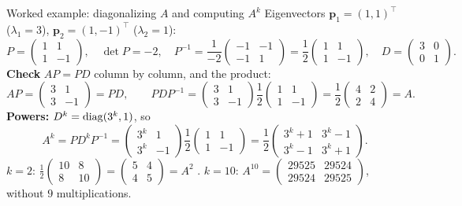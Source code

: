 \documentclass[aspectratio=1610,11pt]{beamer}
\begin{document}
\begin{frame}{Worked example: diagonalizing $A$ and computing $A^k$}
    \small
    Eigenvectors $\mathbf{p}_1 = (1, 1)^\top$ ($\lambda_1 = 3$), $\mathbf{p}_2 = (1, -1)^\top$ ($\lambda_2 = 1$):
    \[P = \begin{pmatrix} 1 & 1 \\ 1 & -1 \end{pmatrix}, \quad \det P = -2, \quad P^{-1} = \frac{1}{-2}\begin{pmatrix} -1 & -1 \\ -1 & 1 \end{pmatrix} = \frac{1}{2}\begin{pmatrix} 1 & 1 \\ 1 & -1 \end{pmatrix}, \quad D = \begin{pmatrix} 3 & 0 \\ 0 & 1 \end{pmatrix}.\]
    \textbf{Check} $AP = PD$ column by column, and the product:
    \[AP = \begin{pmatrix} 3 & 1 \\ 3 & -1 \end{pmatrix} = PD, \qquad PDP^{-1} = \begin{pmatrix} 3 & 1 \\ 3 & -1 \end{pmatrix}\frac{1}{2}\begin{pmatrix} 1 & 1 \\ 1 & -1 \end{pmatrix} = \frac{1}{2}\begin{pmatrix} 4 & 2 \\ 2 & 4 \end{pmatrix} = A.\]
    \textbf{Powers:} $D^k = \operatorname{diag}(3^k, 1)$, so
    \[A^k = PD^kP^{-1} = \begin{pmatrix} 3^k & 1 \\ 3^k & -1 \end{pmatrix}\frac{1}{2}\begin{pmatrix} 1 & 1 \\ 1 & -1 \end{pmatrix} = \frac{1}{2}\begin{pmatrix} 3^k + 1 & 3^k - 1 \\ 3^k - 1 & 3^k + 1 \end{pmatrix}.\]
    $k = 2$: $\frac{1}{2}\begin{pmatrix} 10 & 8 \\ 8 & 10 \end{pmatrix} = \begin{pmatrix} 5 & 4 \\ 4 & 5 \end{pmatrix} = A^2$ \checkmark. \quad $k = 10$: $A^{10} = \begin{pmatrix} 29525 & 29524 \\ 29524 & 29525 \end{pmatrix}$, without $9$ multiplications.
\end{frame}
\end{document}
